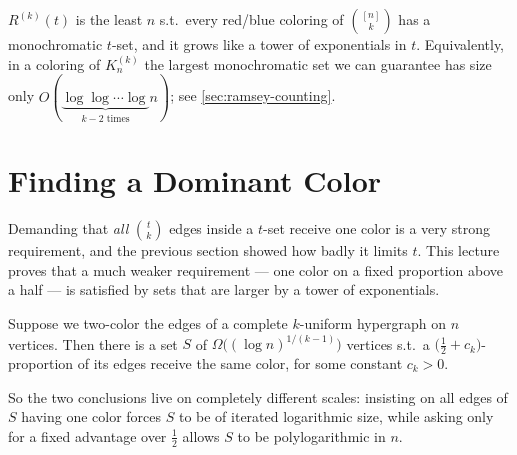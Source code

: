 
\begin{recall}
    \(R^{(k)}(t)\) is the least \(n\) s.t.\ every red/blue coloring of \(\binom{[n]}{k}\) has a monochromatic \(t\)-set, and it grows like a tower of exponentials in \(t\). Equivalently, in a coloring of \(K_n^{(k)}\) the largest monochromatic set we can guarantee has size only \(O(\underbrace{\log \log \cdots \log}_{k-2 \text{ times}} n)\); see \autoref{sec:ramsey-counting}.
\end{recall}

\section{Finding a Dominant Color}\label{sec:dominant-color}

Demanding that \emph{all} \(\binom{t}{k}\) edges inside a \(t\)-set receive one color is a very strong requirement, and the previous section showed how badly it limits \(t\). This lecture proves that a much weaker requirement --- one color on a fixed proportion above a half --- is satisfied by sets that are larger by a tower of exponentials.

\begin{theorem}\label{thm:dominant-color}
    Suppose we two-color the edges of a complete \(k\)-uniform hypergraph on \(n\) vertices. Then there is a set \(S\) of \(\Omega\bigl( (\log n)^{1/(k-1)} \bigr)\) vertices s.t.\ a \(\bigl( \frac{1}{2} + c_k \bigr)\)-proportion of its edges receive the same color, for some constant \(c_k > 0\).
\end{theorem}

So the two conclusions live on completely different scales: insisting on all edges of \(S\) having one color forces \(S\) to be of iterated logarithmic size, while asking only for a fixed advantage over \(\frac{1}{2}\) allows \(S\) to be polylogarithmic in \(n\).
\begin{center}
\end{center}

